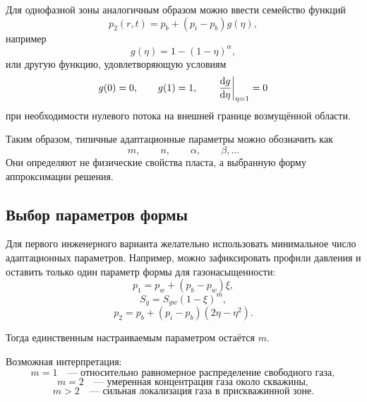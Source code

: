 \documentclass[12pt,a4paper]{article}
\begin{document}
Для однофазной зоны аналогичным образом можно ввести семейство функций
\begin{equation}
    p_2(r,t)=p_b+(p_i-p_b)g(\eta),
\end{equation}
например
\begin{equation}
    g(\eta)=1-(1-\eta)^\alpha,
\end{equation}
или другую функцию, удовлетворяющую условиям
\begin{equation}
    g(0)=0, \qquad g(1)=1, \qquad \left.\dv{g}{\eta}\right|_{\eta=1}=0
\end{equation}
при необходимости нулевого потока на внешней границе возмущённой области.

Таким образом, типичные адаптационные параметры можно обозначить как
\begin{equation}
    m, \qquad n, \qquad \alpha, \qquad \beta, \ldots
\end{equation}
Они определяют не физические свойства пласта, а выбранную форму аппроксимации решения.

\subsection{Выбор параметров формы}

Для первого инженерного варианта желательно использовать минимальное число адаптационных параметров. Например, можно зафиксировать профили давления и оставить только один параметр формы для газонасыщенности:
\begin{equation}
    p_1=p_w+(p_b-p_w)\xi,
\end{equation}
\begin{equation}
    S_g=S_{gw}(1-\xi)^m,
\end{equation}
\begin{equation}
    p_2=p_b+(p_i-p_b)(2\eta-\eta^2).
\end{equation}

Тогда единственным настраиваемым параметром остаётся $m$.

Возможная интерпретация:
\begin{equation}
    m=1
    \quad \text{--- относительно равномерное распределение свободного газа},
\end{equation}
\begin{equation}
    m=2
    \quad \text{--- умеренная концентрация газа около скважины},
\end{equation}
\begin{equation}
    m>2
    \quad \text{--- сильная локализация газа в прискважинной зоне}.
\end{equation}
\end{document}
